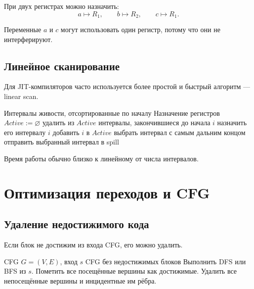 \documentclass[12pt,a4paper]{article}
\begin{document}
При двух регистрах можно назначить:
\[
a\mapsto R_1,\qquad b\mapsto R_2,\qquad c\mapsto R_1.
\]

Переменные $a$ и $c$ могут использовать один регистр, потому что они не интерферируют.

\subsection{Линейное сканирование}

Для JIT-компиляторов часто используется более простой и быстрый алгоритм --- linear scan.

\begin{algorithm}[H]
\caption{Linear Scan Register Allocation}
\begin{algorithmic}[1]
\Require Интервалы живости, отсортированные по началу
\Ensure Назначение регистров
\State $Active := \varnothing$
    \State удалить из $Active$ интервалы, закончившиеся до начала $i$
        \State назначить его интервалу $i$
        \State добавить $i$ в $Active$
    \Else
        \State выбрать интервал с самым дальним концом
        \State отправить выбранный интервал в spill
    \EndIf
\EndFor
\end{algorithmic}
\end{algorithm}

Время работы обычно близко к линейному от числа интервалов.

\section{Оптимизация переходов и CFG}

\subsection{Удаление недостижимого кода}

Если блок не достижим из входа CFG, его можно удалить.

\begin{algorithm}[H]
\caption{Удаление недостижимых блоков}
\begin{algorithmic}[1]
\Require CFG $G=(V,E)$, вход $s$
\Ensure CFG без недостижимых блоков
\State Выполнить DFS или BFS из $s$.
\State Пометить все посещённые вершины как достижимые.
\State Удалить все непосещённые вершины и инцидентные им рёбра.
\end{algorithmic}
\end{algorithm}
\end{document}
